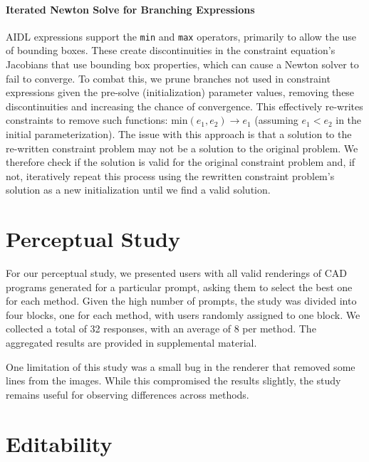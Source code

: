 \paragraph{Iterated Newton Solve for Branching Expressions}
AIDL expressions support the \verb|min| and \verb|max| operators, primarily to allow the use of bounding boxes. These create discontinuities in the constraint equation's Jacobians that use bounding box properties, which can cause a Newton solver to fail to converge. To combat this, we prune branches not used in constraint expressions given the pre-solve (initialization) parameter values, removing these discontinuities and increasing the chance of convergence. This effectively re-writes constraints to remove such functions: $\text{min}(e_1, e_2) \to e_1$ (assuming $e_1 < e_2$ in the initial parameterization). The issue with this approach is that a solution to the re-written constraint problem may not be a solution to the original problem. We therefore check if the solution is valid for the original constraint problem and, if not, iteratively repeat this process using the rewritten constraint problem's solution as a new initialization until we find a valid solution.


\section{Perceptual Study}
\label{app:study}
For our perceptual study, we presented users with all valid renderings of CAD programs generated for a particular prompt, asking them to select the best one for each method. Given the high number of prompts, the study was divided into four blocks, one for each method, with users randomly assigned to one block. We collected a total of 32 responses, with an average of 8 per method. The aggregated results are provided in supplemental material. 

One limitation of this study was a small bug in the renderer that removed some lines from the images. While this compromised the results slightly, the study remains useful for observing differences across methods.

\section{Editability}
\label{app:editability}

